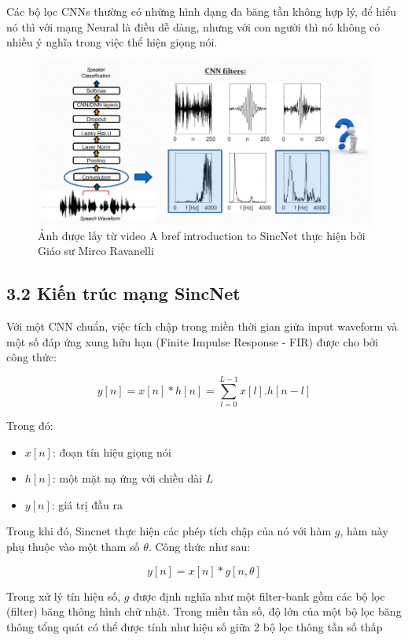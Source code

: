\documentclass{article}
\begin{document}
	Các bộ lọc CNNs thường có những hình dạng đa băng tần không hợp lý, để hiểu nó thì với mạng Neural là điều dễ dàng, nhưng với con người thì nó không có nhiều ý nghĩa trong việc thể hiện giọng nói.
	\begin{figure}[H]
		\centering
		\includegraphics[width=1\textwidth]{images/interpretability_problems.png}
		\caption{Ảnh được lấy từ video A bref introduction to SincNet thực hiện bởi Giáo sư Mirco Ravanelli}
		\label{fig:writing-thesis}
	\end{figure}
	
	
	\subsection{3.2 Kiến trúc mạng SincNet}
	
	Với một CNN chuẩn, việc tích chập trong miền thời gian giữa input waveform và một số đáp ứng xung hữu hạn (Finite Impulse Response - FIR) được cho bởi công thức:
	
	$$y[n] = x[n] * h[n] = \sum_{l=0}^{L-1}x[l].h[n-l]$$ 
	
	Trong đó:
	\begin{itemize}
		\item $x[n]$: đoạn tín hiệu giọng nói
		\item $h[n]$: một mặt nạ ứng với chiều dài $L$
		\item $y[n]$: giá trị đầu ra
	\end{itemize}
	
	Trong khi đó, Sincnet thực hiện các phép tích chập của nó với hàm $g$, hàm này phụ thuộc vào một tham số $\theta$. Công thức như sau:
	
	$$y[n] = x[n] * g[n, \theta]$$
	
	Trong xử lý tín hiệu số, $g$ được định nghĩa như một filter-bank gồm các bộ lọc (filter) băng thông hình chữ nhật. Trong miền tần số, độ lớn của một bộ lọc băng thông tổng quát có thể được tính như hiệu số giữa 2 bộ lọc thông tần số thấp
	
\end{document}
